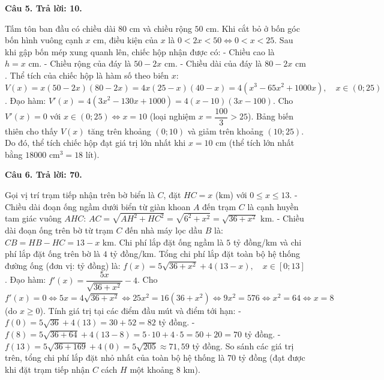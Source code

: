 \documentclass[12pt,a4paper]{article}
\newcommand{\loigiai}[1]{\par\medskip\Needspace{4\baselineskip}\noindent\textbf{#1}\par\nobreak}
\begin{document}
\loigiai{Câu 5. Trả lời: 10.}
Tấm tôn ban đầu có chiều dài $80\text{ cm}$ và chiều rộng $50\text{ cm}$.
Khi cắt bỏ ở bốn góc bốn hình vuông cạnh $x\text{ cm}$, điều kiện của $x$ là $0 < 2x < 50 \iff 0 < x < 25$.
Sau khi gập bốn mép xung quanh lên, chiếc hộp nhận được có:
- Chiều cao là $h=x\text{ cm}$.
- Chiều rộng của đáy là $50-2x\text{ cm}$.
- Chiều dài của đáy là $80-2x\text{ cm}$.
Thể tích của chiếc hộp là hàm số theo biến $x$:
$V(x)=x(50-2x)(80-2x)=4x(25-x)(40-x)=4(x^3-65x^2+1000x),\quad x\in(0;25)$.
Đạo hàm:
$V'(x)=4(3x^2-130x+1000)=4(x-10)(3x-100)$.
Cho $V'(x)=0$ với $x\in(0;25) \iff x=10$ (loại nghiệm $x=\dfrac{100}{3}>25$).
Bảng biến thiên cho thấy $V(x)$ tăng trên khoảng $(0;10)$ và giảm trên khoảng $(10;25)$.
Do đó, thể tích chiếc hộp đạt giá trị lớn nhất khi $x=10\text{ cm}$ (thể tích lớn nhất bằng $18000\text{ cm}^3=18\text{ lít}$).

\loigiai{Câu 6. Trả lời: 70.}
Gọi vị trí trạm tiếp nhận trên bờ biển là $C$, đặt $HC=x$ ($\text{km}$) với $0\le x\le 13$.
- Chiều dài đoạn ống ngầm dưới biển từ giàn khoan $A$ đến trạm $C$ là cạnh huyền tam giác vuông $AHC$:
  $AC=\sqrt{AH^2+HC^2}=\sqrt{6^2+x^2}=\sqrt{36+x^2}\text{ km}$.
- Chiều dài đoạn ống trên bờ từ trạm $C$ đến nhà máy lọc dầu $B$ là:
  $CB=HB-HC=13-x\text{ km}$.
Chi phí lắp đặt ống ngầm là $5$ tỷ đồng/km và chi phí lắp đặt ống trên bờ là $4$ tỷ đồng/km.
Tổng chi phí lắp đặt toàn bộ hệ thống đường ống (đơn vị: tỷ đồng) là:
$f(x)=5\sqrt{36+x^2}+4(13-x),\quad x\in[0;13]$.
Đạo hàm:
$f'(x)=\dfrac{5x}{\sqrt{36+x^2}}-4$.
Cho $f'(x)=0 \iff 5x=4\sqrt{36+x^2} \iff 25x^2=16(36+x^2) \iff 9x^2=576 \iff x^2=64 \iff x=8$ (do $x\ge 0$).
Tính giá trị tại các điểm đầu mút và điểm tới hạn:
- $f(0)=5\sqrt{36}+4(13)=30+52=82$ tỷ đồng.
- $f(8)=5\sqrt{36+64}+4(13-8)=5\cdot 10 + 4\cdot 5 = 50+20=70$ tỷ đồng.
- $f(13)=5\sqrt{36+169}+4(0)=5\sqrt{205}\approx 71{,}59$ tỷ đồng.
So sánh các giá trị trên, tổng chi phí lắp đặt nhỏ nhất của toàn bộ hệ thống là $70$ tỷ đồng (đạt được khi đặt trạm tiếp nhận $C$ cách $H$ một khoảng $8\text{ km}$).
\end{document}
